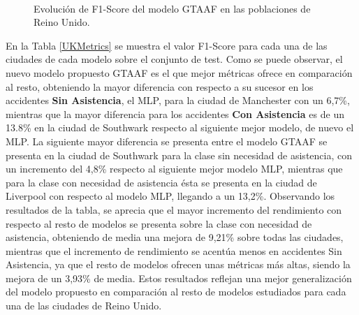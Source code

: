 \begin{figure}[H]
	\\
	\caption{Evolución de F1-Score del modelo GTAAF en las poblaciones de Reino Unido.}
	\label{UKLossFunction}
\end{figure}


En la Tabla \ref{UKMetrics} se muestra el valor F1-Score para cada una de las ciudades de cada modelo sobre el conjunto de test. Como se puede observar, el nuevo modelo propuesto GTAAF es el que mejor métricas ofrece en comparación al resto, obteniendo la mayor diferencia con respecto a su sucesor en los accidentes \textbf{Sin Asistencia}, el MLP, para la ciudad de Manchester con un 6,7\%, mientras que la mayor diferencia para los accidentes \textbf{Con Asistencia} es de un 13.8\% en la ciudad de Southwark respecto al siguiente mejor modelo, de nuevo el MLP. La siguiente mayor diferencia se presenta entre el modelo GTAAF se presenta en la ciudad de Southwark para la clase sin necesidad de asistencia, con un incremento del 4,8\% respecto al siguiente mejor modelo MLP, mientras que para la clase con necesidad de asistencia ésta se presenta en la ciudad de Liverpool con respecto al modelo MLP, llegando a un 13,2\%. Observando los resultados de la tabla, se aprecia que el mayor incremento del rendimiento con respecto al resto de modelos se presenta sobre la clase con necesidad de asistencia, obteniendo de media una mejora de 9,21\% sobre todas las ciudades, mientras que el incremento de rendimiento se acentúa menos en accidentes Sin Asistencia, ya que el resto de modelos ofrecen unas métricas más altas, siendo la mejora de un 3,93\% de media. Estos resultados reflejan una mejor generalización del modelo propuesto en comparación al resto de modelos estudiados para cada una de las ciudades de Reino Unido.


